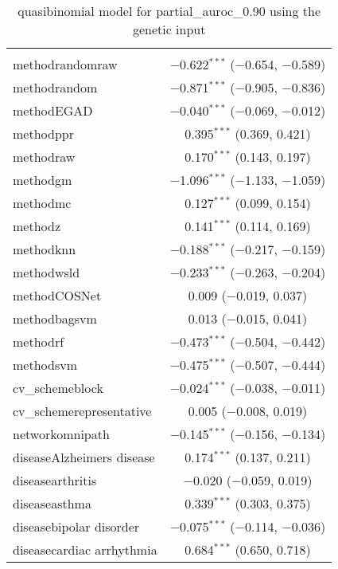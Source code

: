 
\begin{table}[!htbp] \centering 
  \caption{quasibinomial model for partial_auroc_0.90 using the genetic input} 
  \label{} 
\begin{tabular}{@{\extracolsep{5pt}}lc} 
\\[-1.8ex]\hline 
\hline \\[-1.8ex] 
 methodrandomraw & $-$0.622$^{***}$ ($-$0.654, $-$0.589) \\ 
  methodrandom & $-$0.871$^{***}$ ($-$0.905, $-$0.836) \\ 
  methodEGAD & $-$0.040$^{***}$ ($-$0.069, $-$0.012) \\ 
  methodppr & 0.395$^{***}$ (0.369, 0.421) \\ 
  methodraw & 0.170$^{***}$ (0.143, 0.197) \\ 
  methodgm & $-$1.096$^{***}$ ($-$1.133, $-$1.059) \\ 
  methodmc & 0.127$^{***}$ (0.099, 0.154) \\ 
  methodz & 0.141$^{***}$ (0.114, 0.169) \\ 
  methodknn & $-$0.188$^{***}$ ($-$0.217, $-$0.159) \\ 
  methodwsld & $-$0.233$^{***}$ ($-$0.263, $-$0.204) \\ 
  methodCOSNet & 0.009 ($-$0.019, 0.037) \\ 
  methodbagsvm & 0.013 ($-$0.015, 0.041) \\ 
  methodrf & $-$0.473$^{***}$ ($-$0.504, $-$0.442) \\ 
  methodsvm & $-$0.475$^{***}$ ($-$0.507, $-$0.444) \\ 
  cv\_schemeblock & $-$0.024$^{***}$ ($-$0.038, $-$0.011) \\ 
  cv\_schemerepresentative & 0.005 ($-$0.008, 0.019) \\ 
  networkomnipath & $-$0.145$^{***}$ ($-$0.156, $-$0.134) \\ 
  diseaseAlzheimers disease & 0.174$^{***}$ (0.137, 0.211) \\ 
  diseasearthritis & $-$0.020 ($-$0.059, 0.019) \\ 
  diseaseasthma & 0.339$^{***}$ (0.303, 0.375) \\ 
  diseasebipolar disorder & $-$0.075$^{***}$ ($-$0.114, $-$0.036) \\ 
  diseasecardiac arrhythmia & 0.684$^{***}$ (0.650, 0.718) \\ 

\end{tabular}
\end{table}

